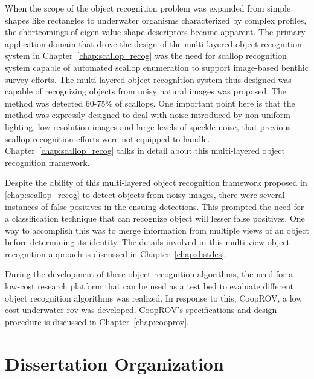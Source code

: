 \documentclass {udthesis}
\begin{document}
When the scope of the object recognition problem was expanded from simple shapes like rectangles to underwater organisms characterized by complex profiles,
the shortcomings of eigen-value shape descriptors became apparent. The primary application domain that drove the design of the multi-layered object recognition system in Chapter~\ref{chap:scallop_recog} was the need for 
scallop recognition system capable of automated scallop enumeration to support image-based benthic survey efforts. 
The multi-layered object recognition system thus designed was capable of recognizing objects from noisy natural images was proposed. The method was detected 60-75\% of scallops. One important point here is that the method was expressly designed to deal with noise introduced by non-uniform lighting, low resolution images and large levels of speckle noise, that previous scallop recognition efforts were not equipped to handle. Chapter~\ref{chap:scallop_recog} talks in detail about this multi-layered object recognition framework.

Despite the ability of this multi-layered object recognition framework proposed in \ref{chap:scallop_recog} to detect objects from noisy images, there were 
several instances of false positives in the ensuing detections. This prompted the need for a classification technique that can recognize object will lesser
false positives. One way to accomplish this was to merge information from multiple views of an object before determining its identity. The details involved in this
multi-view object recognition approach is discussed in Chapter~\ref{chap:distdes}.

During the development of these object recognition algorithms, the need for a low-cost research platform 
that can be used as a test bed to evaluate different object recognition algorithms was realized.
In response to this, CoopROV, a low cost underwater \gls{rov} was developed. CoopROV's specifications and 
design procedure is discussed in Chapter~\ref{chap:cooprov}.

\section{Dissertation Organization}
\end{document}
